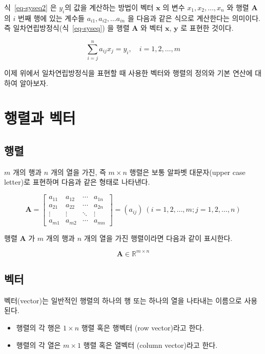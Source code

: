 \documentclass[
  11pt,
  a4paper,
  oneside]{scrbook}
\providecommand{\tightlist}{%
  \setlength{\itemsep}{0pt}\setlength{\parskip}{0pt}}\usepackage{longtable,booktabs,array}
\newcommand{\RR}{\mathbb{R}}
\theoremstyle{definition}
\theoremstyle{definition}
\theoremstyle{plain}
\theoremstyle{remark}
\begin{document}
식~\ref{eq-syseq2} 은 \(y_i\)의 값을 계산하는 방법이 벡터 \(\pmb x\) 의
변수 \(x_1,x_2,\dots,x_n\) 와 행렬 \(\pmb A\) 의 \(i\) 번째 행에 있는
계수들 \(a_{i1}, a_{i2}, \dots a_{in}\) 을 다음과 같은 식으로 계산한다는
의미이다. 즉 일차연립방정식(식~\ref{eq-syseq}) 을 행렬 \(\pmb A\) 와
벡터 \(\pmb x\), \(\pmb y\) 로 표현한 것이다.

\[ \sum_{i=j}^n a_{ij} x_j = y_i, \quad i=1,2,\dots,m \]

이제 위에서 일차연립방정식을 표현할 때 사용한 벡터와 행렬의 정의와 기본
연산에 대하여 알아보자.

\section{행렬과 벡터}\label{uxd589uxb82cuxacfc-uxbca1uxd130}

\subsection{행렬}\label{uxd589uxb82c}

\(m\) 개의 행과 \(n\) 개의 열을 가진, 즉 \(m \times n\) 행렬은 보통
알파벳 대문자(upper case letter)로 표현하며 다음과 같은 형태로 나타낸다.

\[
\pmb A =
\begin{bmatrix}
a_{11} & a_{12} & \cdots & a_{1n} \\
a_{21} & a_{22} & \cdots & a_{2n} \\
\vdots & \vdots & \ddots & \vdots \\
a_{m1} & a_{m2} & \cdots & a_{mn}
\end{bmatrix}
=(a_{ij})~ (i=1,2,\dots,m; j=1,2,\dots,n)
\]

행렬 \(\pmb A\) 가 \(m\) 개의 행과 \(n\) 개의 열을 가진 행렬이라면
다음과 같이 표시한다.

\[  \pmb A \in \RR^{m \times n} \]

\subsection{벡터}\label{uxbca1uxd130}

벡터(vector)는 일반적인 행렬의 하나의 행 또는 하나의 열을 나타내는
이름으로 사용된다.

\begin{itemize}
\tightlist
\item
  행렬의 각 행은 \(1 \times n\) 행렬 혹은 행벡터 (row vector)라고 한다.
\item
  행렬의 각 열은 \(m \times 1\) 행렬 혹은 열벡터 (column vector)라고
  한다.
\end{itemize}
\end{document}
